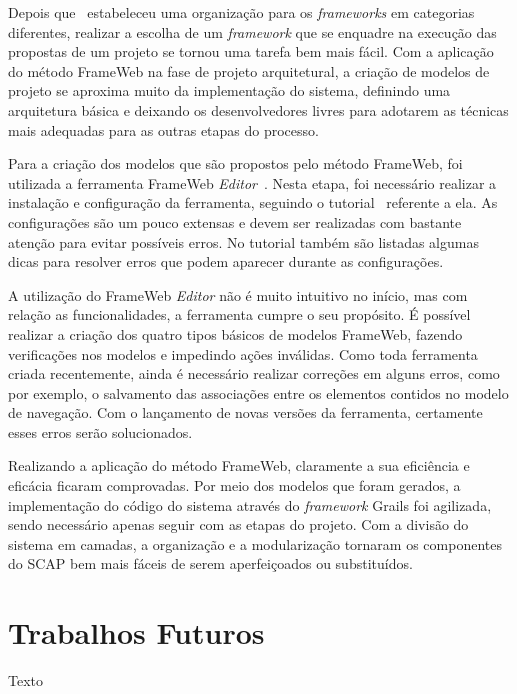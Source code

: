 Depois que~ estabeleceu uma organização para os \textit{frameworks} em categorias diferentes, realizar a escolha de um \textit{framework} que se enquadre na execução das propostas de um projeto se tornou uma tarefa bem mais fácil. Com a aplicação do método FrameWeb na fase de projeto arquitetural, a criação de modelos de projeto se aproxima muito da implementação do sistema, definindo uma arquitetura básica e deixando os desenvolvedores livres para adotarem as técnicas mais adequadas para as outras etapas do processo.

Para a criação dos modelos que são propostos pelo método FrameWeb, foi utilizada a ferramenta FrameWeb \textit{Editor}~\cite{campos-souza:webmedia17}. Nesta etapa, foi necessário realizar a instalação e configuração da ferramenta, seguindo o tutorial~\cite{souza:ftt21} referente a ela. As configurações são um pouco extensas e devem ser realizadas com bastante atenção para evitar possíveis erros. No tutorial também são listadas algumas dicas para resolver erros que podem aparecer durante as configurações.

A utilização do FrameWeb \textit{Editor} não é muito intuitivo no início, mas com relação as funcionalidades, a ferramenta cumpre o seu propósito. É possível realizar a criação dos quatro tipos básicos de modelos FrameWeb, fazendo verificações nos modelos e impedindo ações inválidas. Como toda ferramenta criada recentemente, ainda é necessário realizar correções em alguns erros, como por exemplo, o salvamento das associações entre os elementos contidos no modelo de navegação. Com o lançamento de novas versões da ferramenta, certamente esses erros serão solucionados.

Realizando a aplicação do método FrameWeb, claramente a sua eficiência e eficácia ficaram comprovadas. Por meio dos modelos que foram gerados, a implementação do código do sistema através do \textit{framework} Grails foi agilizada, sendo necessário apenas seguir com as etapas do projeto. Com a divisão do sistema em camadas, a organização e a modularização tornaram os componentes do SCAP bem mais fáceis de serem aperfeiçoados ou substituídos.                          

\section{Trabalhos Futuros}
\label{sec-conclusoes-trabalhos-futuros}

Texto
